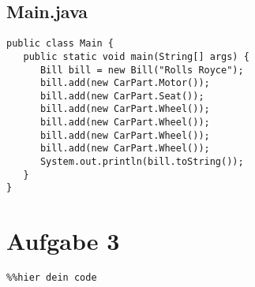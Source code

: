 \documentclass[12pt,a4paper,oneside,ngerman]{article}
\begin{document}
\subsection*{Main.java}
\begin{lstlisting}
public class Main {
   public static void main(String[] args) {
      Bill bill = new Bill("Rolls Royce");
      bill.add(new CarPart.Motor());
      bill.add(new CarPart.Seat());
      bill.add(new CarPart.Wheel());
      bill.add(new CarPart.Wheel());
      bill.add(new CarPart.Wheel());
      bill.add(new CarPart.Wheel());
      System.out.println(bill.toString());
   }
}
\end{lstlisting}

\section*{Aufgabe 3}
\begin{lstlisting}
%%hier dein code
\end{lstlisting}
\end{document}
